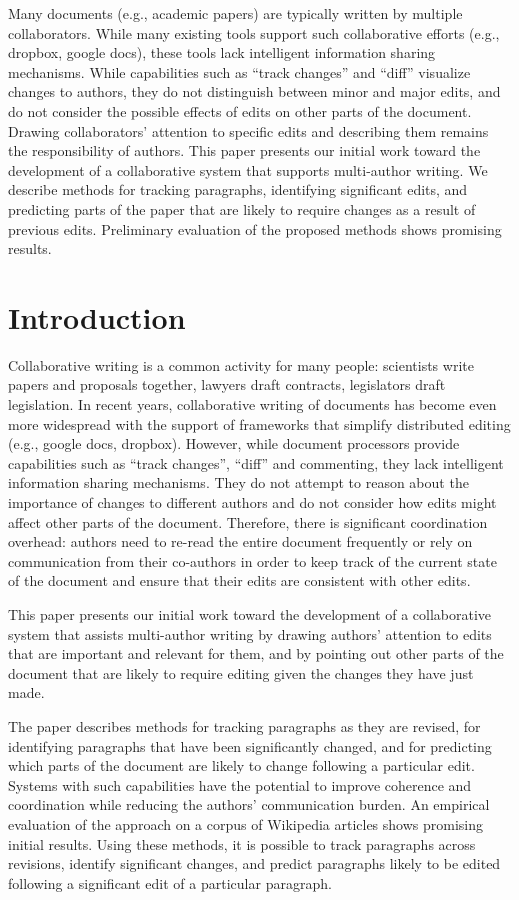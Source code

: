 Many documents (e.g., academic papers) are typically written by multiple
collaborators. While many existing tools support such collaborative
efforts (e.g., dropbox, google docs), these tools lack intelligent
information sharing mechanisms. While capabilities such as ``track
changes'' and ``diff'' visualize changes to authors, they do not
distinguish between minor and major edits, and do not consider the
possible effects of edits on other parts of the document. Drawing
collaborators' attention to specific edits and describing them remains
the responsibility of authors. This paper presents our initial work
toward the development of a collaborative system that supports
multi-author writing. We describe methods for tracking paragraphs,
identifying significant edits, and predicting parts of the paper that
are likely to require changes as a result of previous edits. Preliminary
evaluation of the proposed methods shows promising results.

\section{Introduction}\label{introduction}

Collaborative writing is a common activity for many people: scientists
write papers and proposals together, lawyers draft contracts,
legislators draft legislation. In recent years, collaborative writing of
documents has become even more widespread with the support of frameworks
that simplify distributed editing (e.g., google docs, dropbox). However,
while document processors provide capabilities such as ``track
changes'', ``diff'' and commenting, they lack intelligent information
sharing mechanisms. They do not attempt to reason about the importance
of changes to different authors and do not consider how edits might
affect other parts of the document. Therefore, there is significant
coordination overhead: authors need to re-read the entire document
frequently or rely on communication from their co-authors in order to
keep track of the current state of the document and ensure that their
edits are consistent with other edits.

This paper presents our initial work toward the development of a
collaborative system that assists multi-author writing by drawing
authors' attention to edits that are important and relevant for them,
and by pointing out other parts of the document that are likely to
require editing given the changes they have just made.

The paper describes methods for tracking paragraphs as they are revised,
for identifying paragraphs that have been significantly changed, and for
predicting which parts of the document are likely to change following a
particular edit. Systems with such capabilities have the potential to
improve coherence and coordination while reducing the authors'
communication burden. An empirical evaluation of the approach on a
corpus of Wikipedia articles shows promising initial results. Using
these methods, it is possible to track paragraphs across revisions,
identify significant changes, and predict paragraphs likely to be edited
following a significant edit of a particular paragraph.

